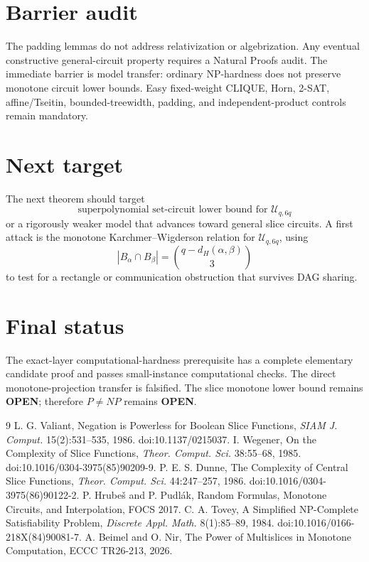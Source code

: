 \documentclass[11pt]{article}
\begin{document}
\section{Barrier audit}
The padding lemmas do not address relativization or algebrization. Any eventual constructive general-circuit property requires a Natural Proofs audit. The immediate barrier is model transfer: ordinary NP-hardness does not preserve monotone circuit lower bounds. Easy fixed-weight CLIQUE, Horn, 2-SAT, affine/Tseitin, bounded-treewidth, padding, and independent-product controls remain mandatory.

\section{Next target}
The next theorem should target
\[
\boxed{\text{superpolynomial set-circuit lower bound for }\mathcal U_{q,6q}}
\]
or a rigorously weaker model that advances toward general slice circuits. A first attack is the monotone Karchmer--Wigderson relation for \(\mathcal U_{q,6q}\), using
\[
|B_\alpha\cap B_\beta|=\binom{q-d_H(\alpha,\beta)}3
\]
to test for a rectangle or communication obstruction that survives DAG sharing.

\section{Final status}
The exact-layer computational-hardness prerequisite has a complete elementary candidate proof and passes small-instance computational checks. The direct monotone-projection transfer is falsified. The slice monotone lower bound remains \textbf{OPEN}; therefore \(P\ne NP\) remains \textbf{OPEN}.

\begin{thebibliography}{9}
 L. G. Valiant, Negation is Powerless for Boolean Slice Functions, \emph{SIAM J. Comput.} 15(2):531--535, 1986. doi:10.1137/0215037.
 I. Wegener, On the Complexity of Slice Functions, \emph{Theor. Comput. Sci.} 38:55--68, 1985. doi:10.1016/0304-3975(85)90209-9.
 P. E. S. Dunne, The Complexity of Central Slice Functions, \emph{Theor. Comput. Sci.} 44:247--257, 1986. doi:10.1016/0304-3975(86)90122-2.
 P. Hrube\v{s} and P. Pudl\'ak, Random Formulas, Monotone Circuits, and Interpolation, FOCS 2017.
 C. A. Tovey, A Simplified NP-Complete Satisfiability Problem, \emph{Discrete Appl. Math.} 8(1):85--89, 1984. doi:10.1016/0166-218X(84)90081-7.
 A. Beimel and O. Nir, The Power of Multislices in Monotone Computation, ECCC TR26-213, 2026.
\end{thebibliography}
\end{document}
